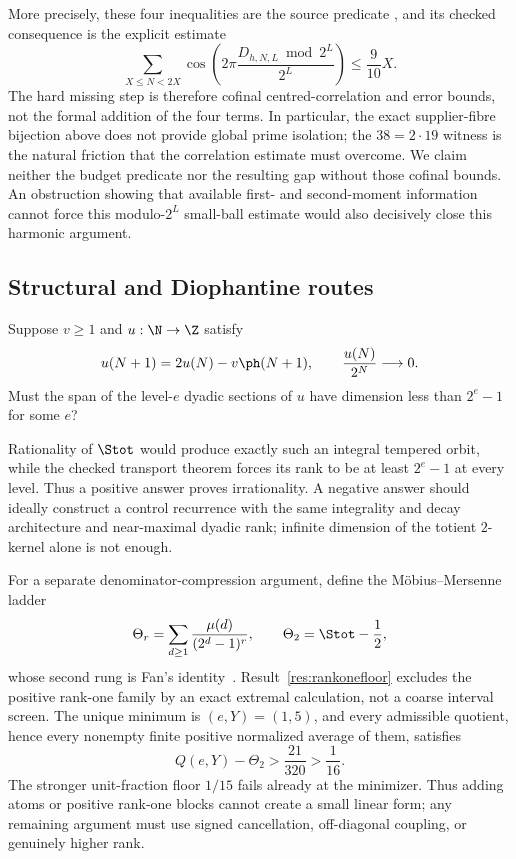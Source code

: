 More precisely, these four inequalities are the source predicate
,
and its checked consequence
is the explicit estimate
\[
 \sum_{X\le N<2X}\cos\!\left(2\pi
   \frac{D_{h,N,L}\bmod 2^L}{2^L}\right)\le\frac9{10}X.
\]
The hard missing step is therefore cofinal centred-correlation
and error bounds, not the formal addition of the four terms.  In particular,
the exact supplier-fibre bijection above does not provide global prime
isolation; the $38=2\cdot19$ witness is the natural friction that the
correlation estimate must overcome.  We claim neither the budget predicate nor
the resulting gap without those cofinal bounds.
An obstruction showing that available first- and second-moment information
cannot force this modulo-$2^L$ small-ball estimate would also decisively close
this harmonic argument.

\subsection{Structural and Diophantine routes}

\begin{problem}\label{prob:carryrank}
Suppose $v\ge1$ and $u:\N\to\Z$ satisfy
\[
 u(N+1)=2u(N)-v\ph(N+1),\qquad \frac{u(N)}{2^N}\longrightarrow0.
\]
Must the span of the level-$e$ dyadic sections of $u$ have dimension less
than $2^e-1$ for some $e$?
\end{problem}

\noindent Rationality of $\Stot$ would produce exactly such an integral
tempered orbit, while the checked transport theorem forces its rank to be at
least $2^e-1$ at every level.  Thus a positive answer proves irrationality.
A negative answer should ideally construct a control recurrence with the same
integrality and decay architecture and near-maximal dyadic rank; infinite
dimension of the totient $2$-kernel alone is not enough.

For a separate denominator-compression argument, define the M\"obius--Mersenne
ladder
\[
 \Theta_r=\sum_{d\ge1}\frac{\mu(d)}{(2^d-1)^r},
 \qquad \Theta_2=\Stot-\frac12,
\]
whose second rung is Fan's identity~\cite{fan2026totient}.
Result~\ref{res:rankonefloor} excludes the positive rank-one family by an
exact extremal calculation, not a coarse interval screen.  The unique minimum
is $(e,Y)=(1,5)$, and every admissible quotient, hence every nonempty finite
positive normalized average of them, satisfies
\[
 Q(e,Y)-\Theta_2>\frac{21}{320}>\frac1{16}.
\]
The stronger unit-fraction floor $1/15$ fails already at the minimizer.  Thus
adding atoms or positive rank-one blocks cannot create a small linear form;
any remaining argument must use signed cancellation, off-diagonal coupling, or
genuinely higher rank.

